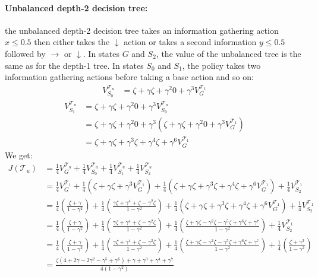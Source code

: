 \paragraph{Unbalanced depth-2 decision tree:}the unbalanced depth-2 decision tree  takes an information gathering action $x\leq0.5$ then either takes the $\downarrow$ action or takes a second information $y\leq0.5$ followed by $\rightarrow$ or $\downarrow$.
In states $G$ and $S_2$, the value of the unbalanced tree is the same as for the depth-1 tree.
In states $S_0$ and $S_1$, the policy takes two information gathering actions before taking a base action and so on:
\begin{align*}
    V^{\mathcal{T}_{u}}_{S_0} &= \zeta + \gamma \zeta + \gamma ^ 2 0 + \gamma ^ 3 V^{\mathcal{T}_1}_G
\end{align*} 
\begin{align*}
    V^{\mathcal{T}_{u}}_{S_1} &= \zeta + \gamma \zeta + \gamma ^ 2 0 + \gamma ^ 3 V^{\mathcal{T}_u}_{S_0} \\ 
    &= \zeta + \gamma \zeta + \gamma ^ 2 0 + \gamma ^ 3 (\zeta + \gamma \zeta + \gamma ^ 2 0 + \gamma ^ 3 V^{\mathcal{T}_1}_G) \\
    &= \zeta + \gamma \zeta + \gamma ^ 3 \zeta + \gamma ^ 4 \zeta + \gamma ^ 6 V^{\mathcal{T}_1}_G
\end{align*}
We get:
\begin{align*}
    J(\mathcal{T}_{u}) &= \frac{1}{4} V^{\mathcal{T}_u}_G + \frac{1}{4} V^{\mathcal{T}_u}_{S_0} + \frac{1}{4}V^{\mathcal{T}_u}_{S_1} + \frac{1}{4}V^{\mathcal{T}_u}_{S_2} \\
    &=  \frac{1}{4} V^{\mathcal{T}_1}_G + \frac{1}{4}(\zeta + \gamma \zeta + \gamma ^ 3 V^{\mathcal{T}_1}_G) + \frac{1}{4} (\zeta + \gamma \zeta + \gamma ^ 3 \zeta + \gamma ^ 4 \zeta + \gamma ^ 6 V^{\mathcal{T}_1}_G) + \frac{1}{4}V^{\mathcal{T}_1}_{S_2} \\
    &= \frac{1}{4} (\frac{\zeta + \gamma}{1-\gamma^2}) + \frac{1}{4}(\frac{\gamma\zeta + \gamma^4 + \zeta -\gamma^2\zeta}{1-\gamma^2}) + \frac{1}{4} (\zeta + \gamma \zeta + \gamma ^ 3 \zeta + \gamma ^ 4 \zeta + \gamma ^ 6 V^{\mathcal{T}_1}_G) + \frac{1}{4}V^{\mathcal{T}_1}_{S_2} \\
    &= \frac{1}{4} (\frac{\zeta + \gamma}{1-\gamma^2}) + \frac{1}{4}(\frac{\gamma\zeta + \gamma^4 + \zeta -\gamma^2\zeta}{1-\gamma^2}) + \frac{1}{4} (\frac{\zeta + \gamma\zeta -\gamma^2\zeta-\gamma^5\zeta+\gamma^6\zeta+\gamma^7}{1-\gamma^2}) + \frac{1}{4}V^{\mathcal{T}_1}_{S_2} \\
    &= \frac{1}{4} (\frac{\zeta + \gamma}{1-\gamma^2}) + \frac{1}{4}(\frac{\gamma\zeta + \gamma^4 + \zeta -\gamma^2\zeta}{1-\gamma^2}) + \frac{1}{4} (\frac{\zeta + \gamma\zeta -\gamma^2\zeta-\gamma^5\zeta+\gamma^6\zeta+\gamma^7}{1-\gamma^2}) + \frac{1}{4}(\frac{\zeta + \gamma ^ 3}{1-\gamma^2}) \\
    &= \frac{\zeta(4+2\gamma-2\gamma^2-\gamma^5+\gamma^6)+\gamma+\gamma^3+\gamma^4+\gamma^7}{4(1-\gamma^2)}
\end{align*}
